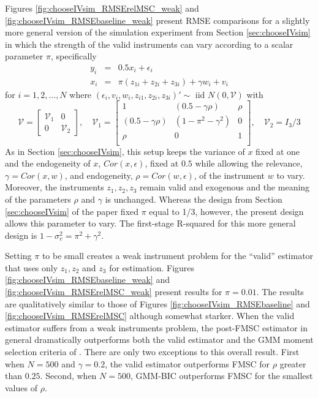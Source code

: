 Figures \ref{fig:chooseIVsim_RMSErelMSC_weak} and \ref{fig:chooseIVsim_RMSEbaseline_weak} present RMSE comparisons for a slightly more general version of the simulation experiment from Section \ref{sec:chooseIVsim} in which the strength of the valid instruments can vary according to a scalar parameter $\pi$, specifically
\begin{eqnarray}
		y_i &=& 0.5 x_i + \epsilon_i\\ 
		\label{eq:chooseIVDGP1_weak}
		x_i &=& \pi (z_{1i} + z_{2i} + z_{3i}) + \gamma w_i + v_i 
		\label{eq:chooseIVDGP2_weak}
	\end{eqnarray}
for $i=1, 2, \hdots, N$ where $(\epsilon_i, v_i, w_i, z_{i1}, z_{2i}, z_{3i})' \sim \mbox{ iid  } N(0,\mathcal{V})$ with
\begin{equation}	
	\mathcal{V} = \left[  \begin{array}
		{cc} \mathcal{V}_1 & 0 \\ 0 & \mathcal{V}_2
	\end{array}\right], \quad
	\mathcal{V}_1 = \left[ \begin{array}
		{ccc} 
		1 & (0.5 - \gamma \rho) & \rho \\
		(0.5 - \gamma \rho) & (1 - \pi^2 - \gamma^2) & 0\\ 
		\rho & 0 & 1 \\ 
	\end{array} \right], \quad \mathcal{V}_2 = I_3 / 3
	\label{eq:chooseIVDGP3_weak}
\end{equation}
As in Section \ref{sec:chooseIVsim}, this setup keeps the variance of $x$ fixed at one and the endogeneity of $x$, $Cor(x, \epsilon)$, fixed at $0.5$ while allowing the relevance, $\gamma = Cor(x,w)$, and endogeneity, $\rho = Cor(w, \epsilon)$, of the instrument $w$ to vary.
Moreover, the instruments $z_1, z_2, z_3$ remain valid and exogenous and the meaning of the parameters $\rho$ and $\gamma$ is unchanged.
Whereas the design from Section \ref{sec:chooseIVsim} of the paper fixed $\pi$ equal to 1/3, however, the present design allows this parameter to vary.
The first-stage R-squared for this more general design is $1 - \sigma_v^2 = \pi^2 + \gamma^2$.

Setting $\pi$ to be small creates a weak instrument problem for the ``valid'' estimator that uses only $z_1, z_2$ and $z_3$ for estimation.
Figures \ref{fig:chooseIVsim_RMSEbaseline_weak} and \ref{fig:chooseIVsim_RMSErelMSC_weak} present results for $\pi = 0.01$.
The results are qualitatively similar to those of Figures \ref{fig:chooseIVsim_RMSEbaseline} and \ref{fig:chooseIVsim_RMSErelMSC} although somewhat starker.
When the valid estimator suffers from a weak instruments problem, the post-FMSC estimator in general dramatically outperforms both the valid estimator and the GMM moment selection criteria of \cite{Andrews1999}.
There are only two exceptions to this overall result.
First when $N = 500$ and $\gamma = 0.2$, the valid estimator outperforms FMSC for $\rho$ greater than $0.25$.
Second, when $N = 500$, GMM-BIC outperforms FMSC for the smallest values of $\rho$.

